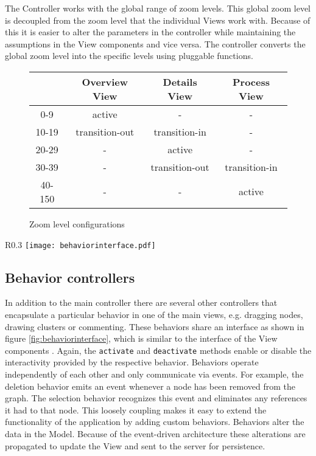 The Controller works with the global range of zoom levels. This global zoom level is decoupled from the zoom level that the individual Views work with. Because of this it is easier to alter the parameters in the controller while maintaining the assumptions in the View components and vice versa. The controller converts the global zoom level into the specific levels using pluggable functions.

\begin{figure}
\begin{center}
\begin{tabular}{|c|c|c|c|}
\hline
& Overview View & Details View & Process View \\ \hline
0-9 & active & - & - \\
10-19 & transition-out & transition-in & - \\
20-29 & - & active & - \\
30-39 & - & transition-out & transition-in \\
40-150 & - & - & active \\ \hline
\end{tabular}
\end{center}
\caption{Zoom level configurations}
\label{fig:zoomtable}
\end{figure}

\begin{wrapfigure}{R}{0.3\textwidth}
\texttt{[image: behaviorinterface.pdf]}
\caption{Class diagram of the Behavior interface}
\label{fig:behaviorinterface}
\end{wrapfigure}

\subsection{Behavior controllers}
\label{sec:behavior}

In addition to the main controller there are several other controllers that encapsulate a particular behavior in one of the main views, e.g. dragging nodes, drawing clusters or commenting. These behaviors share an interface as shown in figure \ref{fig:behaviorinterface}, which is similar to the interface of the View components . Again, the \texttt{activate} and \texttt{deactivate} methods enable or disable the interactivity provided by the respective behavior. Behaviors operate independently of each other and only communicate via events. For example, the deletion behavior emits an event whenever a node has been removed from the graph. The selection behavior recognizes this event and eliminates any references it had to that node. This loosely coupling makes it easy to extend the functionality of the application by adding custom behaviors. Behaviors alter the data in the Model. Because of the event-driven architecture these alterations are propagated to update the View and sent to the server for persistence.


